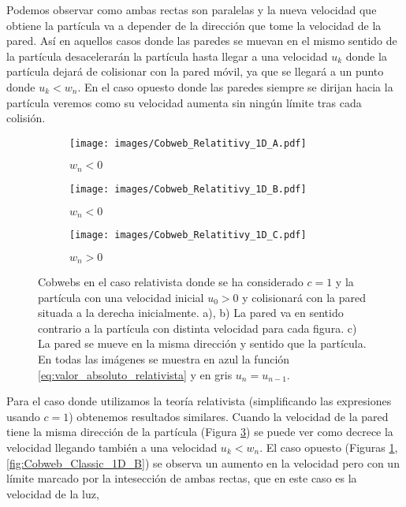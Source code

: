 Podemos observar como ambas rectas son paralelas y la nueva velocidad que obtiene la partícula va a depender de la dirección que tome la velocidad de la pared. Así en aquellos casos donde las paredes se muevan en el mismo sentido de la partícula desacelerarán la partícula hasta llegar a una velocidad \( u_k \) donde la partícula dejará de colisionar con la pared móvil, ya que se llegará a un punto donde \( u_k < w_n \). En el caso opuesto donde las paredes siempre se dirijan hacia la partícula veremos como su velocidad aumenta sin ningún límite tras cada colisión. 

\vspace{3mm}

\begin{figure}[H]
    \centering
    \begin{subfigure}[b]{0.3\textwidth}
        \centering
        \texttt{[image: images/Cobweb\_Relatitivy\_1D\_A.pdf]}
        \caption{$w_n<0$}
        \label{fig:Cobweb_Rel_1D_A}
    \end{subfigure}
    \hfill
    \begin{subfigure}[b]{0.3\textwidth}
        \centering
        \texttt{[image: images/Cobweb\_Relatitivy\_1D\_B.pdf]}
        \caption{$w_n<0$}
        \label{fig:Cobweb_Rel_1D_B}
    \end{subfigure}
    \hfill
    \begin{subfigure}[b]{0.3\textwidth}
        \centering
        \texttt{[image: images/Cobweb\_Relatitivy\_1D\_C.pdf]}
        \caption{$w_n>0$}
        \label{fig:Cobweb_Rel_1D_C}
    \end{subfigure}
    \caption{Cobwebs en el caso relativista donde se ha considerado \( c=1 \) y la partícula  con una velocidad inicial $u_0 > 0$ y colisionará con la pared situada a la derecha inicialmente. a), b) La pared va en sentido contrario a la partícula con distinta velocidad para cada figura. c) La pared se mueve en la misma dirección y sentido que la partícula. En todas las imágenes se muestra en azul la función \ref{eq:valor_absoluto_relativista} y en gris \( u_n = u_{n-1} \).}
        \label{fig:Cobweb_Rel_1D}
\end{figure}

Para el caso donde utilizamos la teoría relativista (simplificando las expresiones usando \( c = 1\)) obtenemos resultados similares. Cuando la velocidad de la pared tiene la misma dirección de la partícula (Figura \ref{fig:Cobweb_Rel_1D_C}) se puede ver como decrece la velocidad llegando también a una velocidad \( u_k < w_n \). El caso opuesto (Figuras \ref{fig:Cobweb_Rel_1D_A}, \ref{fig:Cobweb_Classic_1D_B}) se observa un aumento en la velocidad pero con un límite marcado por la intesección de ambas rectas, que en este caso es la velocidad de la luz,

